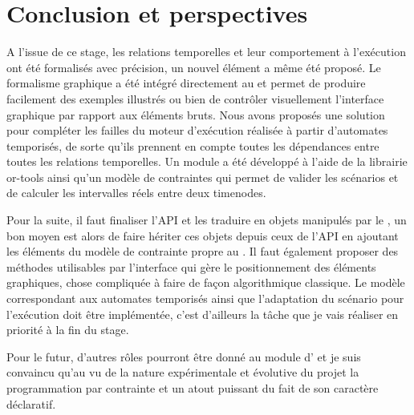 \chapter{Conclusion et perspectives}

A l'issue de ce stage, les relations temporelles et leur comportement à l'exécution ont été formalisés avec précision, un nouvel élément a même été proposé.
%
Le formalisme graphique a été intégré directement au \csp{} et permet de produire facilement des exemples illustrés ou bien de contrôler visuellement l'interface graphique par rapport aux éléments bruts.
%
Nous avons proposés une solution pour compléter les failles du moteur d'exécution réalisée à partir d'automates temporisés, de sorte qu'ils prennent en compte toutes les dépendances entre toutes les relations temporelles.
Un module \csp{} a été développé à l'aide de la librairie or-tools ainsi qu'un modèle de contraintes qui permet de valider les scénarios et de calculer les intervalles réels entre deux timenodes.



Pour la suite, il faut finaliser l'API \ossia{} et les traduire en objets manipulés par le \csp{}, un bon moyen est alors de faire hériter ces objets depuis ceux de l'API en ajoutant les éléments du modèle de contrainte propre au \csp{}.
%
Il faut également proposer des méthodes utilisables par l'interface qui gère le positionnement des éléments graphiques, chose compliquée à faire de façon algorithmique classique.
%
Le modèle correspondant aux automates temporisés ainsi que l'adaptation du scénario pour l'exécution doit être implémentée, c'est d'ailleurs la tâche que je vais réaliser en priorité à la fin du stage.

Pour le futur, d'autres rôles pourront être donné au module \csp{} d'\iscore{} et je suis convaincu qu'au vu de la nature expérimentale et évolutive du projet la programmation par contrainte et un atout puissant du fait de son caractère déclaratif.